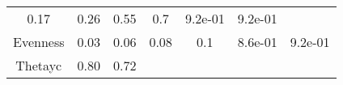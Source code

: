 \documentclass[12pt,]{article}
\begin{document}
\begin{longtable}[]{@{}ccccccc@{}}
\begin{minipage}[t]{0.16\columnwidth}
0.17\strut
\end{minipage} & \begin{minipage}[t]{0.10\columnwidth}\centering\strut
0.26\strut
\end{minipage} & \begin{minipage}[t]{0.15\columnwidth}\centering\strut
0.55\strut
\end{minipage} & \begin{minipage}[t]{0.09\columnwidth}\centering\strut
0.7\strut
\end{minipage} & \begin{minipage}[t]{0.07\columnwidth}\centering\strut
9.2e-01\strut
\end{minipage} & \begin{minipage}[t]{0.10\columnwidth}\centering\strut
9.2e-01\strut
\end{minipage}\tabularnewline
\begin{minipage}[t]{0.14\columnwidth}\centering\strut
Evenness\strut
\end{minipage} & \begin{minipage}[t]{0.16\columnwidth}\centering\strut
0.03\strut
\end{minipage} & \begin{minipage}[t]{0.10\columnwidth}\centering\strut
0.06\strut
\end{minipage} & \begin{minipage}[t]{0.15\columnwidth}\centering\strut
0.08\strut
\end{minipage} & \begin{minipage}[t]{0.09\columnwidth}\centering\strut
0.1\strut
\end{minipage} & \begin{minipage}[t]{0.07\columnwidth}\centering\strut
8.6e-01\strut
\end{minipage} & \begin{minipage}[t]{0.10\columnwidth}\centering\strut
9.2e-01\strut
\end{minipage}\tabularnewline
\begin{minipage}[t]{0.14\columnwidth}\centering\strut
Thetayc\strut
\end{minipage} & \begin{minipage}[t]{0.16\columnwidth}\centering\strut
0.80\strut
\end{minipage} & \begin{minipage}[t]{0.10\columnwidth}\centering\strut
0.72\strut
\end{minipage} & \begin{minipage}[t]{0.15\columnwidth}\centering\strut

\end{minipage}
\end{longtable}
\end{document}
